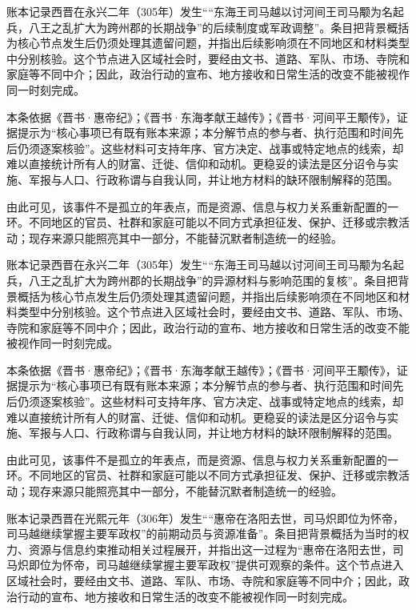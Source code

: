 账本记录西晋在永兴二年（305年）发生““东海王司马越以讨河间王司马颙为名起兵，八王之乱扩大为跨州郡的长期战争”的后续制度或军政调整”。条目把背景概括为核心节点发生后仍须处理其遗留问题，并指出后续影响须在不同地区和材料类型中分别核验。这个节点进入区域社会时，要经由文书、道路、军队、市场、寺院和家庭等不同中介；因此，政治行动的宣布、地方接收和日常生活的改变不能被视作同一时刻完成。

本条依据《晋书·惠帝纪》；《晋书·东海孝献王越传》；《晋书·河间平王颙传》，证据提示为“核心事项已有既有账本来源；本分解节点的参与者、执行范围和时间先后仍须逐案核验”。这些材料可支持年序、官方决定、战事或特定地点的线索，却难以直接统计所有人的财富、迁徙、信仰和动机。更稳妥的读法是区分诏令与实施、军报与人口、行政称谓与自我认同，并让地方材料的缺环限制解释的范围。

由此可见，该事件不是孤立的年表点，而是资源、信息与权力关系重新配置的一环。不同地区的官员、社群和家庭可能以不同方式承担征发、保护、迁移或宗教活动；现存来源只能照亮其中一部分，不能替沉默者制造统一的经验。

账本记录西晋在永兴二年（305年）发生““东海王司马越以讨河间王司马颙为名起兵，八王之乱扩大为跨州郡的长期战争”的异源材料与影响范围的复核”。条目把背景概括为核心节点发生后仍须处理其遗留问题，并指出后续影响须在不同地区和材料类型中分别核验。这个节点进入区域社会时，要经由文书、道路、军队、市场、寺院和家庭等不同中介；因此，政治行动的宣布、地方接收和日常生活的改变不能被视作同一时刻完成。

本条依据《晋书·惠帝纪》；《晋书·东海孝献王越传》；《晋书·河间平王颙传》，证据提示为“核心事项已有既有账本来源；本分解节点的参与者、执行范围和时间先后仍须逐案核验”。这些材料可支持年序、官方决定、战事或特定地点的线索，却难以直接统计所有人的财富、迁徙、信仰和动机。更稳妥的读法是区分诏令与实施、军报与人口、行政称谓与自我认同，并让地方材料的缺环限制解释的范围。

由此可见，该事件不是孤立的年表点，而是资源、信息与权力关系重新配置的一环。不同地区的官员、社群和家庭可能以不同方式承担征发、保护、迁移或宗教活动；现存来源只能照亮其中一部分，不能替沉默者制造统一的经验。

账本记录西晋在光熙元年（306年）发生““惠帝在洛阳去世，司马炽即位为怀帝，司马越继续掌握主要军政权”的前期动员与资源准备”。条目把背景概括为当时的权力、资源与信息约束推动相关过程展开，并指出这一过程为“惠帝在洛阳去世，司马炽即位为怀帝，司马越继续掌握主要军政权”提供可观察的条件。这个节点进入区域社会时，要经由文书、道路、军队、市场、寺院和家庭等不同中介；因此，政治行动的宣布、地方接收和日常生活的改变不能被视作同一时刻完成。


